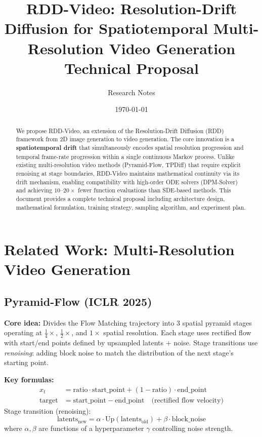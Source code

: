 \documentclass[11pt,a4paper]{article}
\title{\textbf{RDD-Video: Resolution-Drift Diffusion for Spatiotemporal Multi-Resolution Video Generation}\\[0.5em]\large Technical Proposal}
\author{Research Notes}
\date{\today}
\begin{document}
\maketitle

\begin{abstract}
We propose RDD-Video, an extension of the Resolution-Drift Diffusion (RDD) framework from 2D image generation to video generation. The core innovation is a \textbf{spatiotemporal drift} that simultaneously encodes spatial resolution progression and temporal frame-rate progression within a single continuous Markov process. Unlike existing multi-resolution video methods (Pyramid-Flow, TPDiff) that require explicit renoising at stage boundaries, RDD-Video maintains mathematical continuity via its drift mechanism, enabling compatibility with high-order ODE solvers (DPM-Solver) and achieving $10$--$20\times$ fewer function evaluations than SDE-based methods. This document provides a complete technical proposal including architecture design, mathematical formulation, training strategy, sampling algorithm, and experiment plan.
\end{abstract}

\tableofcontents
\newpage

\section{Related Work: Multi-Resolution Video Generation}

\subsection{Pyramid-Flow (ICLR 2025)}

\textbf{Core idea:} Divides the Flow Matching trajectory into 3 spatial pyramid stages operating at $\frac{1}{4}\times$, $\frac{1}{2}\times$, and $1\times$ spatial resolution. Each stage uses rectified flow with start/end points defined by upsampled latents + noise. Stage transitions use \emph{renoising}: adding block noise to match the distribution of the next stage's starting point.

\textbf{Key formulas:}
\begin{align}
x_t &= \text{ratio} \cdot \text{start\_point} + (1-\text{ratio}) \cdot \text{end\_point} \\
\text{target} &= \text{start\_point} - \text{end\_point} \quad \text{(rectified flow velocity)}
\end{align}
Stage transition (renoising):
\begin{equation}
\text{latents}_\text{new} = \alpha \cdot \text{Up}(\text{latents}_\text{old}) + \beta \cdot \text{block\_noise}
\end{equation}
where $\alpha, \beta$ are functions of a hyperparameter $\gamma$ controlling noise strength.
\end{document}
